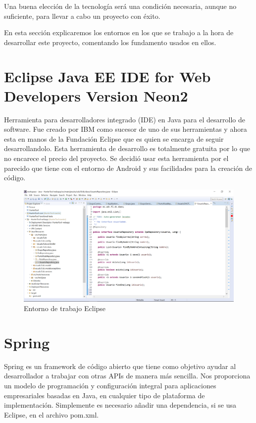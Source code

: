 
Una buena elección de la tecnología será una condición necesaria, aunque no suficiente, para llevar a cabo un proyecto con éxito.

En esta sección explicaremos los entornos en los que se trabajo a la hora de desarrollar este proyecto, comentando los fundamento usados en ellos. 

\section{Eclipse Java EE IDE for Web Developers Version Neon2 }
Herramienta para desarrolladores  integrado (IDE)  en Java para el desarrollo de software. Fue creado por IBM como sucesor de uno de sus herramientas y ahora esta en manos de la Fundación Eclipse que es quien se encarga de seguir desarrollandolo.
 Esta herramienta de desarrollo es totalmente gratuita por lo que no encarece el precio del proyecto. Se decidió usar esta herramienta por el parecido que tiene con el entorno de Android y sus facilidades para la creación de código.
\begin{figure}[H]
		\centering
		\includegraphics[width=1\textwidth] {eclipse.png}
		\caption{Entorno de trabajo Eclipse }
	\end{figure}
	
	
	
\section{Spring}
Spring es un framework de código abierto que tiene como objetivo ayudar al desarrollador a trabajar con otras APIs de manera más sencilla. Nos proporciona un modelo de programación y configuración integral para aplicaciones empresariales basadas en Java, en cualquier tipo de plataforma de implementación. Simplemente es necesario añadir una dependencia, si se usa Eclipse, en el archivo pom.xml. 

